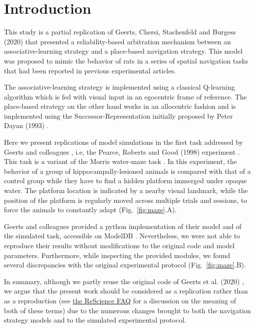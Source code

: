 \section{Introduction}

This study is a partial replication of Geerts, Chersi, Stachenfeld and Burgess (2020) \cite{Geerts:2020} that presented a reliability-based arbitration mechanism between an associative-learning strategy and a place-based navigation strategy. This model was proposed to mimic the behavior of rats in a series of spatial navigation tasks that had been reported in previous experimental articles.

The associative-learning strategy is implemented using a classical Q-learning algorithm which is fed with visual input in an egocentric frame of reference. The place-based strategy on the other hand works in an allocentric fashion and is implemented using the Successor-Representation initially proposed by Peter Dayan (1993) \cite{Dayan:1993}.

Here we present replications of model simulations in the first task addressed by Geerts and colleagues \cite{Geerts:2020}, i.e, the Pearce, Roberts and Good (1998) experiment \cite{Pearce:1998}. This task is a variant of the Morris water-maze task \cite{Morris:1982}. In this experiment, the behavior of a group of hippocampally-lesioned animals is compared with that of a control group while they have to find a hidden platform immerged under opaque water. The platform location is indicated by a nearby visual landmark, while the position of the platform is regularly moved across multiple trials and sessions, to force the animals to constantly adapt (Fig.~\ref{fig:maze}.A).

Geerts and colleagues provided a python implementation of their model and of the simulated task, accessible on ModelDB \cite{modeldb}. Nevertheless, we were not able to reproduce their results without modifications to the original code and model parameters. Furthermore, while inspecting the provided modules, we found several discrepancies with the original experimental protocol (Fig.~\ref{fig:maze}.B).


In summary, although we partly reuse the original code of Geerts et al. (2020) \cite{Geerts:2020}, we argue that the present work should be considered as a replication rather than as a reproduction (see \href{https://rescience.github.io/faq/}{the ReScience FAQ} for a discussion on the meaning of both of these terms) due to the numerous changes brought to both the navigation strategy models and to the simulated experimental protocol.

